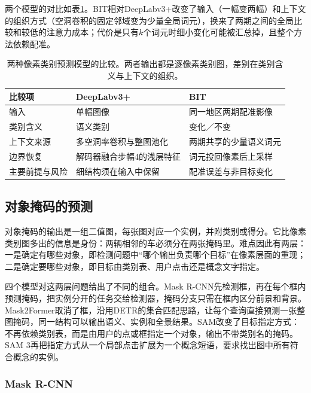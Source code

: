 两个模型的对比如表\ref{tab:vision-recognition-pixel-compare}。BIT相对DeepLabv3+改变了输入（一幅变两幅）和上下文的组织方式（空洞卷积的固定邻域变为少量全局词元），换来了两期之间的全局比较和较低的注意力成本；代价是只有$k$个词元时细小变化可能被汇总掉，且整个方法依赖配准。

\begin{table}[htbp]
 \centering
 \small
 \begin{tabularx}{\linewidth}{@{}lXX@{}}
 \toprule
 比较项 & DeepLabv3+ & BIT\\
 \midrule
 输入 & 单幅图像 & 同一地区两期配准影像\\
 类别含义 & 语义类别 & 变化／不变\\
 上下文来源 & 多空洞率卷积与整图池化 & 两期共享的少量语义词元\\
 边界恢复 & 解码器融合步幅4的浅层特征 & 词元投回像素后上采样\\
 主要前提与风险 & 细结构须在输入中保留 & 配准误差与非目标变化\\
 \bottomrule
 \end{tabularx}
 \caption{两种像素类别预测模型的比较。两者输出都是逐像素类别图，差别在类别含义与上下文的组织。}
 \label{tab:vision-recognition-pixel-compare}
\end{table}

\subsection{对象掩码的预测}
\label{sec:vision-recognition-mask-sets}

对象掩码的输出是一组二值图，每张图对应一个实例，并附类别或得分。它比像素类别图多出的信息是身份：两辆相邻的车必须分在两张掩码里。难点因此有两层：一是确定有哪些对象，即检测问题中“哪个输出负责哪个目标”在像素层面的重现；二是确定要哪些对象，即目标由类别表、用户点击还是概念文字指定。

四个模型对这两层问题给出了不同的组合。Mask R-CNN先检测框，再在每个框内预测掩码，把实例分开的任务交给检测器，掩码分支只需在框内区分前景和背景。Mask2Former取消了框，沿用DETR的集合匹配思路，让每个查询直接预测一张整图掩码，同一结构可以输出语义、实例和全景结果。SAM改变了目标指定方式：不再依赖类别表，而是由用户的点或框指定一个对象，输出不带类别名的掩码。SAM 3再把指定方式从一个局部点击扩展为一个概念短语，要求找出图中所有符合概念的实例。

\subsubsection{Mask R-CNN}
\label{sec:vision-recognition-mask-rcnn}

